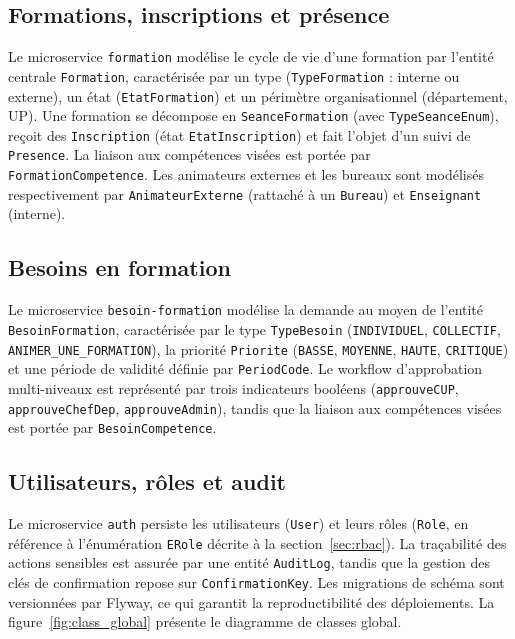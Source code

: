\documentclass[12pt,a4paper]{report}
\begin{document}
\subsection{Formations, inscriptions et présence}

Le microservice \texttt{formation} modélise le cycle de vie d'une formation par
l'entité centrale \texttt{Formation}, caractérisée par un type
(\texttt{TypeFormation} : interne ou externe), un état
(\texttt{EtatFormation}) et un périmètre organisationnel (département, UP).
Une formation se décompose en \texttt{SeanceFormation} (avec
\texttt{TypeSeanceEnum}), reçoit des \texttt{Inscription} (état
\texttt{EtatInscription}) et fait l'objet d'un suivi de \texttt{Presence}. La
liaison aux compétences visées est portée par \texttt{FormationCompetence}. Les
animateurs externes et les bureaux sont modélisés respectivement par
\texttt{AnimateurExterne} (rattaché à un \texttt{Bureau}) et
\texttt{Enseignant} (interne).

\subsection{Besoins en formation}

Le microservice \texttt{besoin-formation} modélise la demande au moyen de l'entité
\texttt{BesoinFormation}, caractérisée par le type \texttt{TypeBesoin}
(\texttt{INDIVIDUEL}, \texttt{COLLECTIF}, \texttt{ANIMER\_UNE\_FORMATION}), la
priorité \texttt{Priorite} (\texttt{BASSE}, \texttt{MOYENNE}, \texttt{HAUTE},
\texttt{CRITIQUE}) et une période de validité définie par \texttt{PeriodCode}.
Le workflow d'approbation multi-niveaux est représenté par trois indicateurs
booléens (\texttt{approuveCUP}, \texttt{approuveChefDep}, \texttt{approuveAdmin}),
tandis que la liaison aux compétences visées est portée par
\texttt{BesoinCompetence}.

\subsection{Utilisateurs, rôles et audit}

Le microservice \texttt{auth} persiste les utilisateurs (\texttt{User}) et leurs
rôles (\texttt{Role}, en référence à l'énumération \texttt{ERole} décrite à la
section~\ref{sec:rbac}). La traçabilité des actions sensibles est assurée par une
entité \texttt{AuditLog}, tandis que la gestion des clés de confirmation repose
sur \texttt{ConfirmationKey}. Les migrations de schéma sont versionnées par
Flyway, ce qui garantit la reproductibilité des déploiements. La
figure~\ref{fig:class_global} présente le diagramme de classes global.
\end{document}
